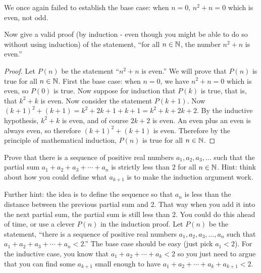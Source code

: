 \begin{questions}
  	\begin{answer}
  		We once again failed to establish the base case: when $n = 0$, $n^2 + n = 0$ which is even, not odd.
  	\end{answer}
  	
  	
  	
  

\question Now give a valid proof (by induction - even though you might be able to do so without using induction) of the statement, ``for all $n \in \mathbb N$, the number $n^2 + n$ is even.''

	\begin{answer}
		  \begin{proof}
		    Let $P(n)$ be the statement ``$n^2 + n$ is even.''  We will prove that $P(n)$ is true for all $n \in \mathbb N$.  First the base case: when $n = 0$, we have $n^2 + n = 0$ which is even, so $P(0)$ is true.  Now suppose for induction that $P(k)$ is true, that is, that $k^2 + k$ is even.  Now consider the statement $P(k+1)$.  Now $(k+1)^2 + (k+1) = k^2 + 2k + 1 + k + 1 = k^2 + k + 2k + 2$.  By the inductive hypothesis, $k^2 + k$ is even, and of course $2k + 2$ is even.  An even plus an even is always even, so therefore $(k+1)^2 + (k+1)$ is even.  Therefore by the principle of mathematical induction, $P(n)$ is true for all $n \in \mathbb N$.
		  \end{proof}
	\end{answer}
	
	
	


\question Prove that there is a sequence of positive real numbers $a_1, a_2, a_3, \ldots$ such that the partial sum $a_1 + a_2 + a_3 + \cdots + a_n$ is strictly less than $2$ for all $n \in \mathbb N$.  Hint: think about how you could define what $a_{k+1}$ is to make the induction argument work.

	\begin{answer}
		 Further hint: the idea is to define the sequence so that $a_n$ is less than the distance between the previous partial sum and 2.  That way when you add it into the next partial sum, the partial sum is still less than 2.  You could do this ahead of time, or use a clever $P(n)$ in the induction proof.  Let $P(n)$ be the statement, ``there is a sequence of positive real numbers $a_1, a_2, a_3, \ldots, a_n$ such that $a_1 + a_2 + a_3 + \cdots + a_n < 2$.''  The base case should be easy (just pick $a_1 < 2$).  For the inductive case, you know that $a_1 + a_2 + \cdots + a_k < 2$ so you just need to argue that you can find some $a_{k+1}$ small enough to have $a_1 + a_2 + \cdots +a_k + a_{k+1} < 2$.
	\end{answer}
	

\end{questions}
